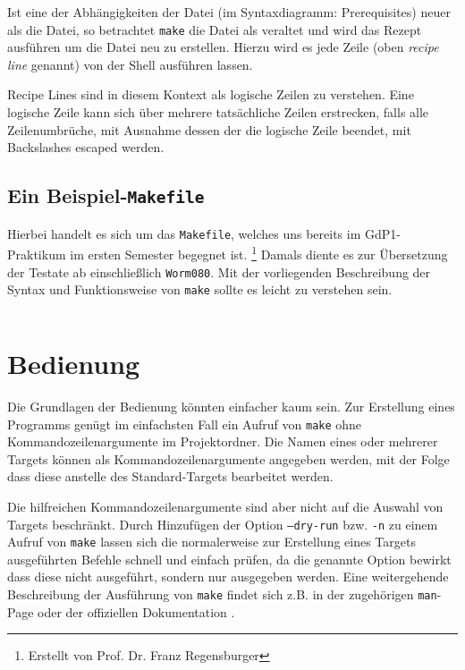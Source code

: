 		Ist eine der Abhängigkeiten der Datei (im Syntaxdiagramm: Prerequisites)
		neuer als die Datei, so betrachtet \texttt{make} die Datei als veraltet
		und wird das Rezept ausführen um die Datei neu zu erstellen. Hierzu wird
		es jede Zeile (oben \textit{recipe line} genannt) von der Shell
		ausführen lassen.

		Recipe Lines sind in diesem Kontext als logische Zeilen zu verstehen.
		Eine logische Zeile kann sich über mehrere tatsächliche Zeilen
		erstrecken, falls alle Zeilenumbrüche, mit Ausnahme dessen der die
		logische Zeile beendet, mit Backslashes escaped werden.


		\clearpage
		\subsection{Ein Beispiel-\texttt{Makefile}}
			\label{subsubsection:examplemakefile}

			Hierbei handelt es sich um das \texttt{Makefile}, welches uns
			bereits im GdP1-Praktikum im ersten Semester begegnet ist.
			\footnote{Erstellt von Prof. Dr. Franz Regensburger} Damals diente
			es zur Übersetzung der Testate ab einschließlich \texttt{Worm080}.
			Mit der vorliegenden Beschreibung der Syntax und Funktionsweise von
			\texttt{make} sollte es leicht zu verstehen sein.

			{
			\footnotesize
			\inputminted[linenos=true,stepnumber=5]{make}{../code/Worm080_Makefile}
			}

\section{Bedienung}

	Die Grundlagen der Bedienung könnten einfacher kaum sein.  Zur Erstellung
	eines Programms genügt im einfachsten Fall ein Aufruf von \texttt{make} ohne
	Kommandozeilenargumente im Projektordner.
	Die Namen eines oder mehrerer Targets können als Kommandozeilenargumente
	angegeben werden, mit der Folge dass diese anstelle des Standard-Targets
	bearbeitet werden.

	Die hilfreichen Kommandozeilenargumente sind aber nicht auf die Auswahl von
	Targets beschränkt. Durch Hinzufügen der Option \texttt{--dry-run} bzw.
	\texttt{-n} zu einem Aufruf von \texttt{make} lassen sich die normalerweise
	zur Erstellung eines Targets ausgeführten Befehle schnell und einfach
	prüfen, da die genannte Option bewirkt dass diese nicht ausgeführt, sondern
	nur ausgegeben werden.
	Eine weitergehende Beschreibung der Ausführung von \texttt{make} findet sich
	z.B. in der zugehörigen \texttt{man}-Page oder der offiziellen Dokumentation
	.
